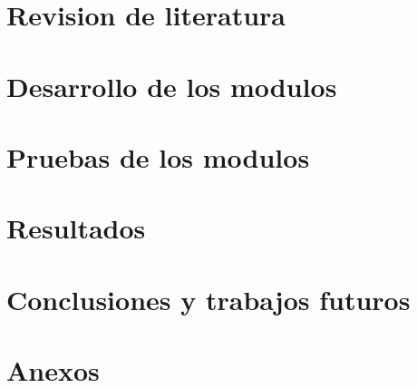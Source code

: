 \documentclass[letterpaper, 11pt, oneside]{book}
\begin{document}
%

%

\chapter{Revision de literatura}


\chapter{Desarrollo de los modulos}


\chapter{Pruebas de los modulos}



\chapter{Resultados}

\chapter{Conclusiones y trabajos futuros}


\printbibliography

\chapter{Anexos}

\end{document}

